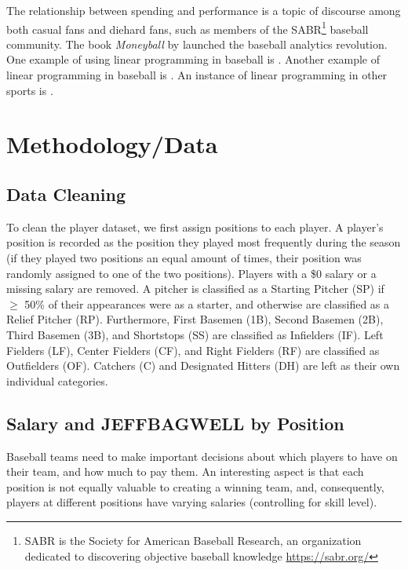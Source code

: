 \documentclass{article}
\begin{document}
The relationship between spending and performance is a topic of discourse among both casual fans and diehard fans, such as members of the SABR\footnote{SABR is the Society for American Baseball Research, an organization dedicated to discovering objective baseball knowledge \url{https://sabr.org/}} baseball community. The book \emph{Moneyball} by \cite{Moneyball} launched the baseball analytics revolution. One example of using linear programming in baseball is \cite{McIntyre2016}. Another example of linear programming in baseball is \cite{Adler99baseball}. An instance of linear programming in other sports is \cite{Aramouni2021}.

\section{Methodology/Data}

\subsection{Data Cleaning}

To clean the player dataset, we first assign positions to each player. A player's position is recorded as the position they played most frequently during the season (if they played two positions an equal amount of times, their position was randomly assigned to one of the two positions). Players with a \$0 salary or a missing salary are removed. A pitcher is classified as a Starting Pitcher (SP) if $\geq$ 50\% of their appearances were as a starter, and otherwise are classified as a Relief Pitcher (RP). Furthermore, First Basemen (1B), Second Basemen (2B), Third Basemen (3B), and Shortstops (SS) are classified as Infielders (IF). Left Fielders (LF), Center Fielders (CF), and Right Fielders (RF) are classified as Outfielders (OF). Catchers (C) and Designated Hitters (DH) are left as their own individual categories. 

\subsection{Salary and JEFFBAGWELL by Position}

Baseball teams need to make important decisions about which players to have on their team, and how much to pay them. An interesting aspect is that each position is not equally valuable to creating a winning team, and, consequently, players at different positions have varying salaries (controlling for skill level). 
\end{document}
